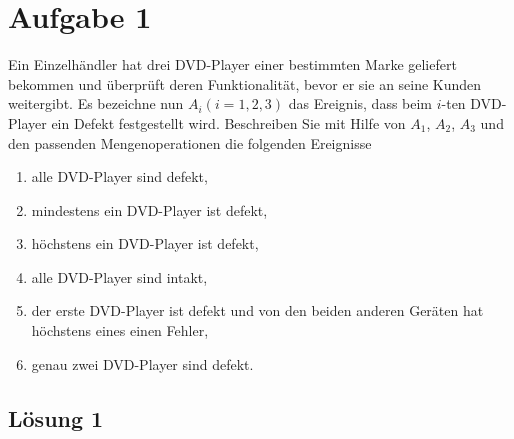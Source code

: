 \documentclass[main.tex]{subfiles}
\begin{document}
\section{Aufgabe 1}
Ein Einzelhändler hat drei DVD-Player einer bestimmten Marke geliefert bekommen und überprüft deren Funktionalität, bevor er sie an seine Kunden weitergibt. Es bezeichne nun $A_i (i = 1, 2, 3)$ das Ereignis, dass beim $i$-ten DVD-Player ein Defekt festgestellt wird. Beschreiben Sie mit Hilfe von $A_1$, $A_2$, $A_3$ und den passenden Mengenoperationen die folgenden Ereignisse
\begin{enumerate}
    \item alle DVD-Player sind defekt,
    \item mindestens ein DVD-Player ist defekt,
    \item höchstens ein DVD-Player ist defekt,
    \item alle DVD-Player sind intakt,
    \item der erste DVD-Player ist defekt und von den beiden anderen Geräten hat höchstens eines einen Fehler,
    \item genau zwei DVD-Player sind defekt.
\end{enumerate}


\subsection{Lösung 1}
\end{document}
